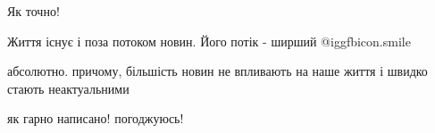\begin{itemize}

Як точно!


Життя існує і поза потоком новин. Його потік - ширший  @igg{fbicon.smile} 


абсолютно. причому, більшість новин не впливають на наше життя і швидко стають неактуальними


як гарно написано! погоджуюсь!

\end{itemize} %
